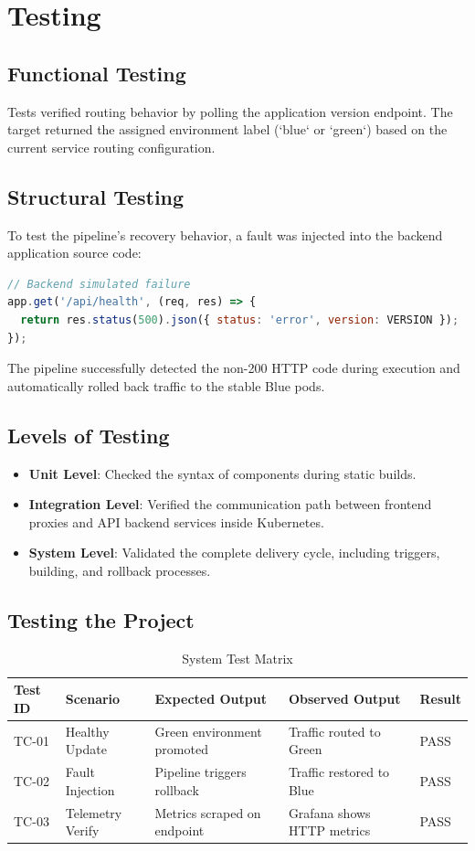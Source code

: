 \documentclass[12pt,a4paper]{article}
\begin{document}
\section{Testing}
\subsection{Functional Testing}
Tests verified routing behavior by polling the application version endpoint. The target returned the assigned environment label (`blue` or `green`) based on the current service routing configuration.

\subsection{Structural Testing}
To test the pipeline's recovery behavior, a fault was injected into the backend application source code:
\begin{lstlisting}[language=JavaScript]
// Backend simulated failure
app.get('/api/health', (req, res) => {
  return res.status(500).json({ status: 'error', version: VERSION });
});
\end{lstlisting}
The pipeline successfully detected the non-200 HTTP code during execution and automatically rolled back traffic to the stable Blue pods.

\subsection{Levels of Testing}
\begin{itemize}
    \item \textbf{Unit Level}: Checked the syntax of components during static builds.
    \item \textbf{Integration Level}: Verified the communication path between frontend proxies and API backend services inside Kubernetes.
    \item \textbf{System Level}: Validated the complete delivery cycle, including triggers, building, and rollback processes.
\end{itemize}

\subsection{Testing the Project}
\begin{table}[h]
\centering
\caption{System Test Matrix}
\begin{tabular}{@{}lllll@{}}
\toprule
\textbf{Test ID} & \textbf{Scenario} & \textbf{Expected Output} & \textbf{Observed Output} & \textbf{Result} \\ \midrule
TC-01 & Healthy Update & Green environment promoted & Traffic routed to Green & PASS \\
TC-02 & Fault Injection & Pipeline triggers rollback & Traffic restored to Blue & PASS \\
TC-03 & Telemetry Verify & Metrics scraped on endpoint & Grafana shows HTTP metrics & PASS \\ \bottomrule
\end{tabular}
\end{table}
\end{document}

